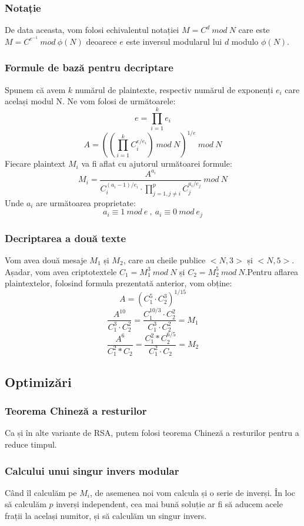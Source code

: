 \documentclass[12]{report}
\begin{document}
		  \subsubsection{Notație}
		  De data aceasta, vom folosi echivalentul notației $M=C^d \ mod \ N$ care este $M=C^{e^{
		  -1}} \ mod \ \phi(N)$ deoarece $e$ este inversul modularul lui $d$ modulo $\phi(N)$.
		  
		  \subsubsection{Formule de bază pentru decriptare}
		  Spunem că avem $k$ numărul de plaintexte, respectiv numărul de exponenți $e_i$ care același modul N. Ne vom folosi de următoarele:
		  $$ e= \prod_{i=1}^{k}e_i$$
		  $$ A =\left( \left(\prod_{i=1}^{k} C_{i}^{e/e_i} \right) \ mod \ N \right)^{1/e} \ mod \ N$$
		  Fiecare plaintext $M_i$ va fi aflat cu ajutorul următoarei formule:
		  $$ M_i = \frac{A^{a_i}}{C_{i}^{(a_i-1)/e_i} \cdot   \prod_{j=1,j \neq i }^{p } C_{j}^{a_i/e_j }                                 } \ mod \ N$$ 	
		  Unde $a_i$ are următoarea proprietate:
		  $$a_i \equiv 1 \ mod \ e \ , \ a_i \equiv 0 \ mod \ e_j$$	  
		  
		  \subsubsection{Decriptarea a două texte}
		  Vom avea două mesaje $M_1$ și $M_2$, care au cheile publice $<N,3>$ și $<N,5>$. Așadar, vom avea criptotextele $C_1 = M_{1}^{3} \ mod \ N$ și $C_2 = M_{2}^{5} \ mod \ N$.Pentru aflarea plaintextelor, folosind formula prezentată anterior, vom obține:
		  $$ A=(C_{1}^{5} \cdot   C_{2}^{3})^{1/15} $$
		  $$\frac{A^{10}}{C_{1}^{3} \cdot   C_{2}^{2}} = \frac{C_{1}^{10/3} \cdot   C_{2}^{2}}{C_{1}^{3} \cdot   C_{2}^{2} }=M_1$$
		  $$\frac{A^6}{C_{1}^{2} *C_{2}}=\frac{C_{1}^{2} *C_{2}^{6/5}}{C_{1}^{2} \cdot   C_{2}}=M_2 $$
		  
		  \subsection{Optimizări}
		  \subsubsection{Teorema Chineză a resturilor}
		  Ca și în alte variante de RSA, putem folosi teorema Chineză a resturilor pentru a reduce timpul.
		  \subsubsection{Calcului unui singur invers modular}
		  Când îl calculăm pe $M_i$, de asemenea noi vom calcula și o serie de inverși. În loc să calculăm $p$ inverși independent, cea mai bună soluție ar fi să aducem acele frații la același numitor, și să calculăm un singur invers.
\end{document}
